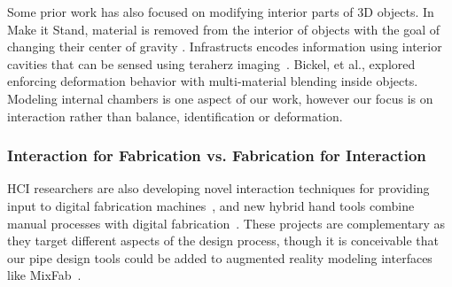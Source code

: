 
Some prior work has also focused on modifying interior parts of 3D objects. 
In Make it Stand, material is removed from the interior of objects with the goal of changing their center of gravity \cite{Prevost-makeitstand}. Infrastructs encodes information using interior cavities that can be sensed using teraherz imaging~\cite{Willis-infrastructs}. Bickel, et al., explored enforcing deformation behavior with multi-material blending inside objects\cite{Bickel-deformation}. Modeling internal chambers is one aspect of our work, however our focus is on interaction rather than balance, identification or deformation.  

\subsubsection{Interaction for Fabrication vs. Fabrication for Interaction}
HCI researchers are also developing novel interaction techniques for providing input to digital fabrication machines~\cite{Mueller-constructable,Willis-interactive,mixfab}, and new hybrid hand tools combine manual processes with digital fabrication~\cite{zoran2013freed,rivers2012position}. These projects are complementary as they target different aspects of the design process, though it is conceivable that our pipe design tools could be added to augmented reality modeling interfaces like MixFab~\cite{mixfab}.